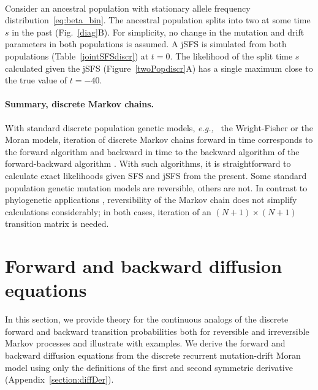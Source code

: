 \documentclass[preprint]{elsarticle}
\newcommand\eg{{\it e.g.,}}
\begin{document}
\\

Consider an ancestral population with stationary allele frequency distribution~\eqref{eq:beta_bin}. The ancestral population splits into two at some time $s$ in the past (Fig.~\ref{diag}B). For simplicity, no change in the mutation and drift parameters in both populations is assumed. A jSFS is simulated from both populations (Table~\ref{jointSFSdiscr}) at $t=0$. The likelihood of the split time $s$ calculated given the jSFS (Figure~\ref{twoPopdiscr}A) has a single maximum close to the true value of $t=-40$.

\paragraph{Summary, discrete Markov chains.} With standard discrete population genetic models, \eg  the Wright-Fisher or the Moran models, iteration of discrete Markov chains forward in time corresponds to the forward algorithm and backward in time to the backward algorithm of the forward-backward algorithm \citep{Rabi86}. With such algorithms, it is straightforward to calculate exact likelihoods given SFS and jSFS from the present. Some standard population genetic mutation models are reversible, others are not. In contrast to phylogenetic applications \citep{Fels81,Schrempf2016}, reversibility of the Markov chain does not simplify calculations considerably; in both cases, iteration of an $(N+1)\times (N+1)$ transition matrix is needed.


\section{Forward and backward diffusion equations}\label{forwBackDiff}

In this section, we provide theory for the continuous analogs of the discrete forward and backward transition probabilities both for reversible and irreversible Markov processes and illustrate with examples. We derive the forward and backward diffusion equations from the discrete recurrent mutation-drift Moran model using only the definitions of the first and second symmetric derivative (Appendix~\ref{section:diffDer}).
\end{document}
